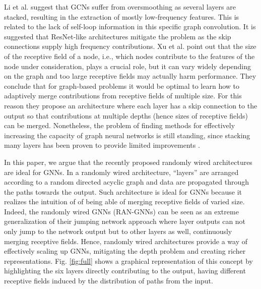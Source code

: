 \documentclass[10pt,twocolumn,twoside]{IEEEtran}
\begin{document}
Li et al. \cite{li2019deepgcns} suggest that GCNs suffer from oversmoothing as several layers are stacked, resulting in the extraction of mostly low-frequency features. This is related to the lack of self-loop information in this specific graph convolution. It is suggested that ResNet-like architectures mitigate the problem as the skip connections supply high frequency contributions. Xu et al. \cite{xu2018representation} point out that the size of the receptive field of a node, i.e., which nodes contribute to the features of the node under consideration, plays a crucial role, but it can vary widely depending on the graph and too large receptive fields may actually harm performance. They conclude that for graph-based problems it would be optimal to learn how to adaptively merge contributions from receptive fields of multiple size. For this reason they propose an architecture where each layer has a skip connection to the output so that contributions at multiple depths (hence sizes of receptive fields) can be merged.  Nonetheless, the problem of finding methods for effectively increasing the capacity of graph neural networks is still standing, since stacking many layers has been proven to provide limited improvements \cite{li2019deepgcns, oono2019graph, alon2020bottleneck, nt2019revisiting}.

In this paper, we argue that the recently proposed randomly wired architectures \cite{xie2019exploring} are ideal for GNNs. In a randomly wired architecture, ``layers'' are arranged according to a random directed acyclic graph and data are propagated through the paths towards the output. Such architecture is ideal for GNNs because it realizes the intuition of \cite{xu2018representation} of being able of merging receptive fields of varied size. Indeed, the randomly wired GNNs (RAN-GNNs) can be seen as an extreme generalization of their jumping network approach where layer outputs can not only jump to the network output but to other layers as well, continuously merging receptive fields. Hence, randomly wired architectures provide a way of effectively scaling up GNNs, mitigating the depth problem and creating richer representations. Fig. \ref{fig:full} shows a graphical representation of this concept by highlighting the six layers directly contributing to the output, having different receptive fields induced by the distribution of paths from the input.
\end{document}
